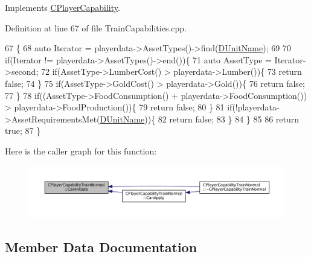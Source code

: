 Implements \hyperlink{classCPlayerCapability_aa83b1e1fcaff2985c378132d679154ea}{C\+Player\+Capability}.



Definition at line 67 of file Train\+Capabilities.\+cpp.


\begin{DoxyCode}
67                                                                                                            
                     \{
68     \textcolor{keyword}{auto} Iterator = playerdata->AssetTypes()->find(\hyperlink{classCPlayerCapabilityTrainNormal_aed40686355e78c151910e23ea2d9d32c}{DUnitName});
69     
70     \textcolor{keywordflow}{if}(Iterator != playerdata->AssetTypes()->end())\{
71         \textcolor{keyword}{auto} AssetType = Iterator->second;
72         \textcolor{keywordflow}{if}(AssetType->LumberCost() > playerdata->Lumber())\{
73             \textcolor{keywordflow}{return} \textcolor{keyword}{false};   
74         \}
75         \textcolor{keywordflow}{if}(AssetType->GoldCost() > playerdata->Gold())\{
76             \textcolor{keywordflow}{return} \textcolor{keyword}{false};   
77         \}
78         \textcolor{keywordflow}{if}((AssetType->FoodConsumption() + playerdata->FoodConsumption()) > playerdata->FoodProduction())\{
79             \textcolor{keywordflow}{return} \textcolor{keyword}{false};    
80         \}
81         \textcolor{keywordflow}{if}(!playerdata->AssetRequirementsMet(\hyperlink{classCPlayerCapabilityTrainNormal_aed40686355e78c151910e23ea2d9d32c}{DUnitName}))\{
82             \textcolor{keywordflow}{return} \textcolor{keyword}{false};
83         \}
84     \}
85     
86     \textcolor{keywordflow}{return} \textcolor{keyword}{true};
87 \}
\end{DoxyCode}
Here is the caller graph for this function\+:
\nopagebreak
\begin{figure}[H]
\begin{center}
\leavevmode
\includegraphics[width=350pt]{classCPlayerCapabilityTrainNormal_ac49cf646b94220844a03b7c3a8a7f215_icgraph}
\end{center}
\end{figure}


\subsection{Member Data Documentation}
\hypertarget{classCPlayerCapabilityTrainNormal_a20934470ff6a9ba1cba5969dba8102e4}{}\label{classCPlayerCapabilityTrainNormal_a20934470ff6a9ba1cba5969dba8102e4} 

